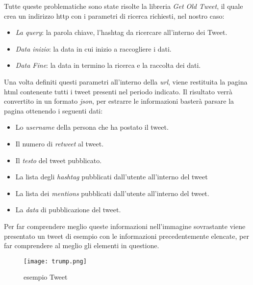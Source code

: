 Tutte queste problematiche sono state risolte la libreria \textit{Get Old Tweet}, il quale crea un indirizzo http con i parametri di ricerca richiesti, nel nostro caso:
\begin{itemize}
\item \textit{La query}: la parola chiave, l'hashtag da ricercare all'interno dei Tweet.
\item \textit{Data inizio}: la data in cui inizio a raccogliere i dati.
\item \textit{Data Fine}: la data in termino la ricerca e la raccolta dei dati.
\end{itemize}
Una volta definiti questi parametri all'interno della \textit{url}, viene restituita la pagina html contenente tutti i  tweet presenti nel periodo indicato. Il risultato verrà convertito in un formato \textit{json}, per estrarre le informazioni basterà parsare la pagina ottenendo i seguenti dati:
\begin{itemize}
\item Lo \textit{username} della persona che ha postato il tweet.
\item Il numero di \textit{retweet} al tweet. 
\item Il \textit{testo} del tweet pubblicato.
\item La lista  degli \textit{hashtag} pubblicati dall'utente all'interno del tweet
\item La lista dei \textit{mentions} pubblicati dall'utente all'interno del tweet.
\item La \textit{data} di pubblicazione del tweet.
\end{itemize}
Per far comprendere meglio queste informazioni nell'immagine sovrastante viene presentato un tweet di esempio con le informazioni precedentemente elencate, per far comprendere al meglio gli elementi in questione.
\begin{figure}[h]
    \begin{center}
      \texttt{[image: trump.png]}
	\caption{esempio Tweet}
    \end{center}
  \end{figure}
  
